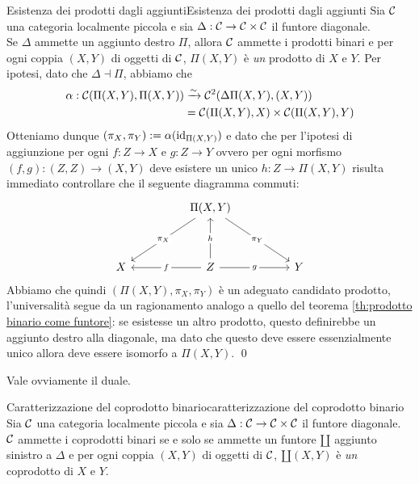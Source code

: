 \documentclass[openany]{book}
\renewcommand\C{\mc{C}}
\begin{document}
\begin{theorem}{Esistenza dei prodotti dagli aggiunti}{Esistenza dei prodotti dagli aggiunti}
    Sia $\C$ una categoria localmente piccola e sia $\Delta :\C\to\C\times\C$ il funtore diagonale.\\
    Se $\Delta$ ammette un aggiunto destro $\Pi$, allora $\C$ ammette i prodotti binari e per ogni coppia $(X,Y)$ di oggetti di $\C$, $\Pi(X,Y)$ è \textit{un} prodotto di $X$ e $Y$.
    \proof 
    Per ipotesi, dato che $\Delta \dashv \Pi$, abbiamo che 
    \begin{align*}
        \alpha : \C(\Pi(X,Y),\Pi(X,Y)) & \iso \C^2(\Delta\Pi(X,Y),(X,Y)) \\
        & = \C(\Pi(X,Y),X) \times \C(\Pi(X,Y),Y)
    \end{align*}
    Otteniamo dunque $(\pi_X,\pi_Y) := \alpha( \operatorname{id}_{\Pi(X,Y)} )$ e dato che per l'ipotesi di aggiunzione per ogni $f:Z\to X$ e $g:Z\to Y$ ovvero per ogni morfismo $(f,g):(Z,Z)\to(X,Y)$ deve esistere un unico $h: Z\to\Pi(X,Y)$ risulta immediato controllare che il seguente diagramma commuti:
    \[\begin{tikzcd}
    	&& {\Pi(X,Y)} && \\
	    \\
	    X && Z && Y
	    \arrow["{\pi_X}"{description}, from=1-3, to=3-1]
	    \arrow["{\pi_Y}"{description}, from=1-3, to=3-5]
	    \arrow["h"{description}, from=3-3, to=1-3]
	    \arrow["f"{description}, from=3-3, to=3-1]
	    \arrow["g"{description}, from=3-3, to=3-5]
    \end{tikzcd}\]
    Abbiamo che quindi $(\Pi(X,Y),\pi_X,\pi_Y)$ è un adeguato candidato prodotto, l'universalità segue da un ragionamento analogo a quello del teorema \cref{th:prodotto binario come funtore}: se esistesse un altro prodotto, questo definirebbe un aggiunto destro alla diagonale, ma dato che questo deve essere essenzialmente unico allora deve essere isomorfo a $\Pi(X,Y)$.
    \qed
\end{theorem}

Vale ovviamente il duale.

\begin{corollary}{Caratterizzazione del coprodotto binario}{caratterizzazione del coprodotto binario}
    Sia $\C$ una categoria localmente piccola e sia $\Delta :\C\to\C\times\C$ il funtore diagonale.\\
    $\C$ ammette i coprodotti binari se e solo se ammette un funtore $\amalg$ aggiunto sinistro a $\Delta$ e per ogni coppia $(X,Y)$ di oggetti di $\C$, $\amalg(X,Y)$ è \textit{un} coprodotto di $X$ e $Y$.
\end{corollary}
\end{document}
